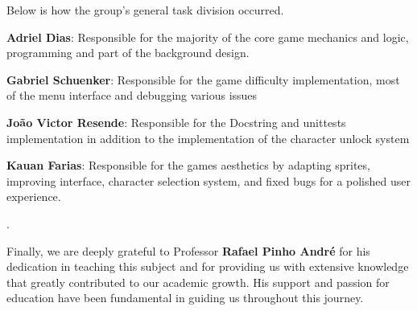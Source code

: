 \documentclass[a4paper,12pt]{article}
\begin{document}
Below is how the group's general task division occurred.

\textbf{Adriel Dias}: Responsible for the majority of the core game mechanics and logic, programming and part of the background design.

\textbf{Gabriel Schuenker}: Responsible for the game difficulty implementation, most of the menu interface and debugging various issues
    
 \textbf{João Victor Resende}: Responsible for the Docstring and unittests implementation in addition to the implementation of the character unlock system
 
 \textbf{Kauan Farias}: Responsible for the games aesthetics by adapting sprites, improving interface, character selection system, and fixed bugs for a polished user experience.

.


Finally, we are deeply grateful to Professor\textbf{ Rafael Pinho André} for his dedication in teaching this subject and for providing us with extensive knowledge that greatly contributed to our academic growth. His support and passion for education have been fundamental in guiding us throughout this journey.
\end{document}
